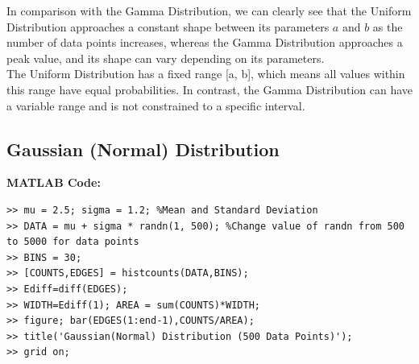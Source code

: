 \documentclass{article}
\theoremstyle{mytheoremstyle}
\theoremstyle{mytheoremstyle}
\theoremstyle{myproblemstyle}
\begin{document}
In comparison with the Gamma Distribution, we can clearly see that the Uniform Distribution approaches a constant shape between its parameters $a$ and $b$ as the number of data points increases, whereas the Gamma Distribution approaches a peak value, and its shape can vary depending on its parameters. \\ The Uniform Distribution has a fixed range [a, b], which means all values within this range have equal probabilities. In contrast, the Gamma Distribution can have a variable range and is not constrained to a specific interval. 

\newpage
\subsection*{Gaussian (Normal) Distribution}

\textbf{MATLAB Code:}
\begin{lstlisting}[caption={Gaussian (Normal) Distribution},label={Gaussian}]
>> mu = 2.5; sigma = 1.2; %Mean and Standard Deviation
>> DATA = mu + sigma * randn(1, 500); %Change value of randn from 500 to 5000 for data points
>> BINS = 30; 
>> [COUNTS,EDGES] = histcounts(DATA,BINS); 
>> Ediff=diff(EDGES);
>> WIDTH=Ediff(1); AREA = sum(COUNTS)*WIDTH;
>> figure; bar(EDGES(1:end-1),COUNTS/AREA);
>> title('Gaussian(Normal) Distribution (500 Data Points)');
>> grid on;
\end{lstlisting}
\end{document}
